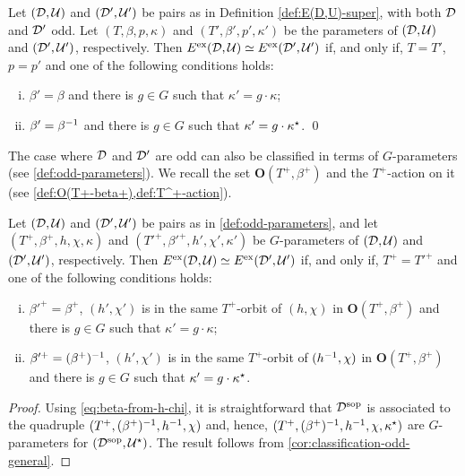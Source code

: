 \begin{thm}\label{thm:iso-D-odd-ExEsop}
    Let $(\mathcal{D}, \mathcal U)$ and $(\mathcal{D}', \mathcal U')$ be pairs as in Definition \ref{def:E(D,U)-super}, with both $\mathcal{D}$ and $\mathcal{D}'$ odd. 
    Let $(T, \beta, p, \kappa)$ and $(T', \beta', p', \kappa')$ be the parameters of $(\mathcal{D}, \mathcal U)$ and $(\mathcal{D}', \mathcal U')$, respectively. 
	Then $E^{\mathrm{ex}}(\mathcal{D}, \mathcal U) \simeq E^{\mathrm{ex}}(\mathcal{D}', \mathcal U')$ if, and only if, $T=T'$, $p = p'$ and one of the following conditions holds:
	\begin{enumerate}[(i)]
	    \item $\beta'=\beta$ and there is $g\in G$ such that $\kappa' = g \cdot \kappa$;
	    \item $\beta'=\beta^{-1}$ and there is $g\in G$ such that $\kappa' = g \cdot \kappa^\star$. \qed
	\end{enumerate}
\end{thm}


The case where $\mathcal{D}$ and $\mathcal{D}'$ are odd can also be classified in terms of $G$-parameters (see \cref{def:odd-parameters}). 
We recall the set $\mathbf {O} (T^+, \beta^+)$ and the $T^+$-action on it (see  \cref{def:O(T+-beta+),def:T^+-action}). 

\begin{thm}\label{thm:iso-D-odd-ExEsop-unsharp}
    Let $(\mathcal{D}, \mathcal U)$ and $(\mathcal{D}', \mathcal U')$ be pairs as in  \cref{def:odd-parameters}, and let ${(T^+, \beta^+, h, \chi, \kappa)}$ and ${(T'^+, \beta'^+, h', \chi', \kappa')}$ be $G$-parameters of $(\mathcal{D}, \mathcal U)$ and $(\mathcal{D}', \mathcal U')$, respectively. 
    Then $E^{\mathrm{ex}}(\mathcal{D}, \mathcal U) \simeq E^{\mathrm{ex}}(\mathcal{D}', \mathcal U')$ if, and only if,  $T^+=T'^+$ and one of the following conditions holds:
    \begin{enumerate}[(i)]
	    \item $\beta'^+=\beta^+$, $(h', \chi')$ is in the same $T^+$-orbit of $(h, \chi)$ in $\mathbf {O} (T^+, \beta^+)$ and there is $g\in G$ such that $\kappa' = g \cdot \kappa$;
	    \item $\beta'^+= (\beta^+)^{-1}$, $(h', \chi')$ is in the same $T^+$-orbit of $(h^{-1}, \chi)$ in $\mathbf {O} (T^+, \beta^+)$ and there is $g\in G$ such that $\kappa' = g \cdot \kappa^\star$.
	\end{enumerate}
\end{thm}

\begin{proof}
    Using \cref{eq:beta-from-h-chi}, it is straightforward that $\mathcal{D}^{\mathrm{sop}}$ is associated to the quadruple $(T^+, (\beta^+)^{-1}, h^{-1}, \chi)$ 
    and, hence, $(T^+, (\beta^+)^{-1}, h^{-1}, \chi, \kappa^\star)$ are $G$-parameters for $(\mathcal{D}^{\mathrm{sop}}, \mathcal U^\star)$. 
    The result follows from \cref{cor:classification-odd-general}. 
\end{proof}